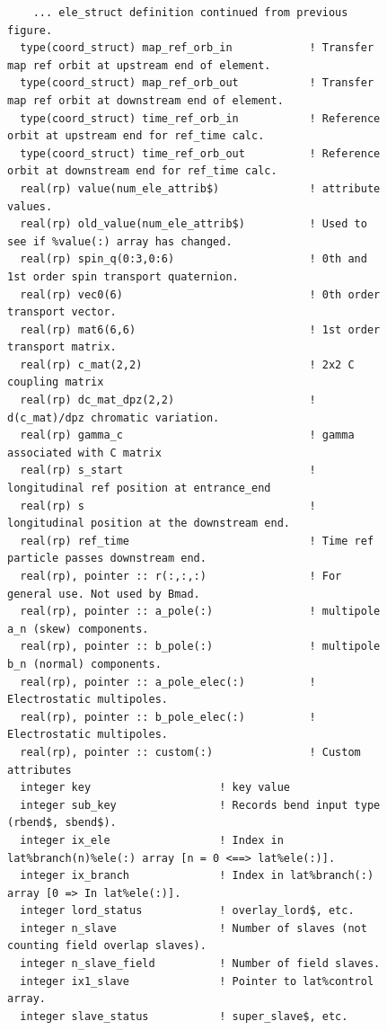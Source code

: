 \begin{figure}[tb]
\centering
\footnotesize
\begin{verbatim}
    ... ele_struct definition continued from previous figure.
  type(coord_struct) map_ref_orb_in            ! Transfer map ref orbit at upstream end of element.
  type(coord_struct) map_ref_orb_out           ! Transfer map ref orbit at downstream end of element.
  type(coord_struct) time_ref_orb_in           ! Reference orbit at upstream end for ref_time calc.
  type(coord_struct) time_ref_orb_out          ! Reference orbit at downstream end for ref_time calc.
  real(rp) value(num_ele_attrib$)              ! attribute values.
  real(rp) old_value(num_ele_attrib$)          ! Used to see if %value(:) array has changed.
  real(rp) spin_q(0:3,0:6)                     ! 0th and 1st order spin transport quaternion.
  real(rp) vec0(6)                             ! 0th order transport vector.
  real(rp) mat6(6,6)                           ! 1st order transport matrix.
  real(rp) c_mat(2,2)                          ! 2x2 C coupling matrix
  real(rp) dc_mat_dpz(2,2)                     ! d(c_mat)/dpz chromatic variation.
  real(rp) gamma_c                             ! gamma associated with C matrix
  real(rp) s_start                             ! longitudinal ref position at entrance_end
  real(rp) s                                   ! longitudinal position at the downstream end.
  real(rp) ref_time                            ! Time ref particle passes downstream end.
  real(rp), pointer :: r(:,:,:)                ! For general use. Not used by Bmad.
  real(rp), pointer :: a_pole(:)               ! multipole a_n (skew) components.
  real(rp), pointer :: b_pole(:)               ! multipole b_n (normal) components.
  real(rp), pointer :: a_pole_elec(:)          ! Electrostatic multipoles.
  real(rp), pointer :: b_pole_elec(:)          ! Electrostatic multipoles.
  real(rp), pointer :: custom(:)               ! Custom attributes
  integer key                    ! key value
  integer sub_key                ! Records bend input type (rbend$, sbend$).
  integer ix_ele                 ! Index in lat%branch(n)%ele(:) array [n = 0 <==> lat%ele(:)].
  integer ix_branch              ! Index in lat%branch(:) array [0 => In lat%ele(:)].
  integer lord_status            ! overlay_lord$, etc.
  integer n_slave                ! Number of slaves (not counting field overlap slaves).
  integer n_slave_field          ! Number of field slaves.
  integer ix1_slave              ! Pointer to lat%control array.
  integer slave_status           ! super_slave$, etc.

\end{verbatim}
\end{figure}
